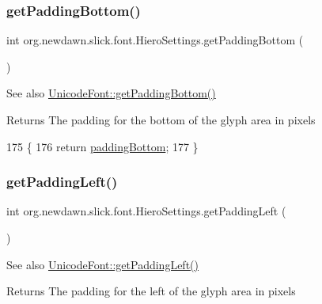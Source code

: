 \subsubsection{\texorpdfstring{get\+Padding\+Bottom()}{getPaddingBottom()}}
{\footnotesize\ttfamily int org.\+newdawn.\+slick.\+font.\+Hiero\+Settings.\+get\+Padding\+Bottom (\begin{DoxyParamCaption}{ }\end{DoxyParamCaption})\hspace{0.3cm}{\ttfamily [inline]}}

\begin{DoxySeeAlso}{See also}
\mbox{\hyperlink{classorg_1_1newdawn_1_1slick_1_1_unicode_font_a219e5cb9fec3686abec0906668a89b6c}{Unicode\+Font\+::get\+Padding\+Bottom()}}
\end{DoxySeeAlso}
\begin{DoxyReturn}{Returns}
The padding for the bottom of the glyph area in pixels 
\end{DoxyReturn}

\begin{DoxyCode}
175                                   \{
176         \textcolor{keywordflow}{return} \mbox{\hyperlink{classorg_1_1newdawn_1_1slick_1_1font_1_1_hiero_settings_a4ae9e95c341789431f72c0d7ad54b348}{paddingBottom}};
177     \}
\end{DoxyCode}
\mbox{\label{classorg_1_1newdawn_1_1slick_1_1font_1_1_hiero_settings_a978f51a4553ad3e4107998107d836ac7}} 
\subsubsection{\texorpdfstring{get\+Padding\+Left()}{getPaddingLeft()}}
{\footnotesize\ttfamily int org.\+newdawn.\+slick.\+font.\+Hiero\+Settings.\+get\+Padding\+Left (\begin{DoxyParamCaption}{ }\end{DoxyParamCaption})\hspace{0.3cm}{\ttfamily [inline]}}

\begin{DoxySeeAlso}{See also}
\mbox{\hyperlink{classorg_1_1newdawn_1_1slick_1_1_unicode_font_ae7524dd1bc030351f6a739206e97413a}{Unicode\+Font\+::get\+Padding\+Left()}}
\end{DoxySeeAlso}
\begin{DoxyReturn}{Returns}
The padding for the left of the glyph area in pixels 
\end{DoxyReturn}


